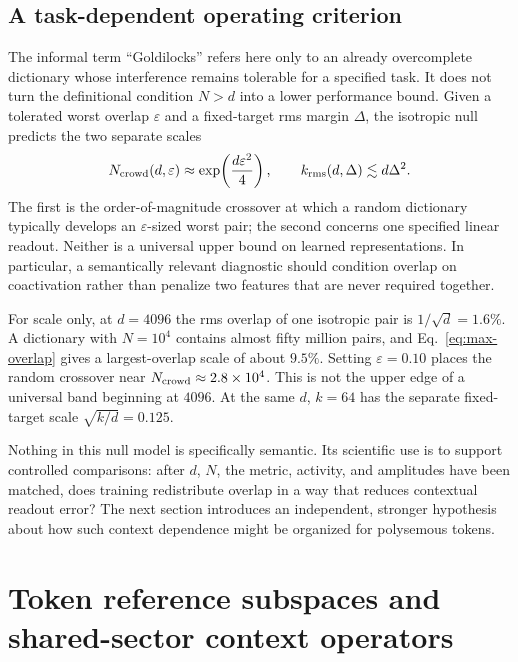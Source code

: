 \documentclass[
  aps,
  reprint,
  superscriptaddress,
  floatfix,
  nofootinbib,
  longbibliography
]{revtex4-2}
\newcommand{\Nsem}{N}
\begin{document}
\subsection{A task-dependent operating criterion}
\label{sec:operating-criterion}

The informal term ``Goldilocks'' refers here only to an already overcomplete
dictionary whose interference remains tolerable for a specified task.  It
does not turn the definitional condition $\Nsem>d$ into a lower performance
bound.  Given a tolerated worst overlap $\varepsilon$ and a fixed-target rms
margin $\Delta$, the isotropic null predicts the two separate scales
%
\begin{equation}
\label{eq:dual}
N_{\rm crowd}(d,\varepsilon)
\approx\exp\!\left(\frac{d\varepsilon^2}{4}\right),
\qquad
k_{\rm rms}(d,\Delta)\lesssim d\Delta^2.
\end{equation}
%
The first is the order-of-magnitude crossover at which a random dictionary
typically develops an $\varepsilon$-sized worst pair; the second concerns one
specified linear readout.  Neither is a universal upper bound on learned
representations.  In particular, a semantically relevant diagnostic should
condition overlap on coactivation rather than penalize two features that are
never required together.

For scale only, at $d=4096$ the rms overlap of one isotropic pair is
$1/\sqrt d=1.6\%$.  A dictionary with $\Nsem=10^4$ contains almost fifty
million pairs, and Eq.~\eqref{eq:max-overlap} gives a largest-overlap scale of
about $9.5\%$.  Setting $\varepsilon=0.10$ places the random crossover near
$N_{\rm crowd}\approx2.8\times10^4$.  This is not the upper edge of a universal
band beginning at $4096$.  At the same $d$, $k=64$ has the separate
fixed-target scale $\sqrt{k/d}=0.125$.

Nothing in this null model is specifically semantic.  Its scientific use is
to support controlled comparisons: after $d$, $\Nsem$, the metric, activity,
and amplitudes have been matched, does training redistribute overlap in a way
that reduces contextual readout error?  The next section introduces an
independent, stronger hypothesis about how such context dependence might be
organized for polysemous tokens.

\section{Token reference subspaces and shared-sector context operators}
\label{sec:reference}
\end{document}
